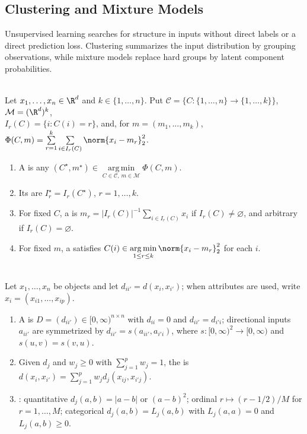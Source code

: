 \subsection{Clustering and Mixture Models}

Unsupervised learning searches for structure in inputs without direct labels or a direct prediction loss.  Clustering summarizes the input distribution by grouping observations, while mixture models replace hard groups by latent component probabilities.

\begin{definition} \label{def:sl-kmeans-objective} \\
Let $x_1,\ldots,x_n\in\R^d$ and $k\in\{1,\ldots,n\}$. Put $\mathcal C=\{C:\{1,\ldots,n\}\to\{1,\ldots,k\}\}$, $\mathcal M=(\R^d)^k$,\\
$I_r(C)=\{i:C(i)=r\}$, and, for $m=(m_1,\ldots,m_k)$, $\Phi(C,m)=\sum\limits_{r=1}^k\sum\limits_{i\in I_r(C)}\norm{x_i-m_r}_2^2$.
\begin{enumerate}[label=(\roman*)]
\setlength{\itemsep}{0pt}
\item A  is any $(C^\star,m^\star)\in\operatorname*{arg\,min}\limits_{C\in\mathcal C,\,m\in\mathcal M}\Phi(C,m)$.
\item Its  are $I_r^\star=I_r(C^\star)$, $r=1,\ldots,k$.
\item For fixed $C$, a  is $m_r=|I_r(C)|^{-1}\sum\limits_{i\in I_r(C)}x_i$ if $I_r(C)\neq\varnothing$, and arbitrary if $I_r(C)=\varnothing$.
\item For fixed $m$, a  satisfies $C(i)\in\operatorname*{arg\,min}\limits_{1\leq r\leq k}\norm{x_i-m_r}_2^2$ for each $i$.
\end{enumerate}
\end{definition}

\begin{definition} \label{def:sl-clustering-dissimilarity} \\
Let $x_1,\ldots,x_n$ be objects and let $d_{ii'}=d(x_i,x_{i'})$; when attributes are used, write $x_i=(x_{i1},\ldots,x_{ip})$.
\begin{enumerate}[label=(\roman*)]
\setlength{\itemsep}{0pt}
\item A  is $D=(d_{ii'})\in[0,\infty)^{n\times n}$ with $d_{ii}=0$ and $d_{ii'}=d_{i'i}$; directional inputs $a_{ii'}$ are symmetrized by $d_{ii'}=s(a_{ii'},a_{i'i})$, where $s:[0,\infty)^2\to[0,\infty)$ and $s(u,v)=s(v,u)$.
\item Given $d_j$ and $w_j\geq0$ with $\sum\limits_{j=1}^p w_j=1$, the  is $d(x_i,x_{i'})=\sum\limits_{j=1}^p w_jd_j(x_{ij},x_{i'j})$.
\item {}: quantitative $d_j(a,b)=|a-b|$ or $(a-b)^2$; ordinal $r\mapsto(r-1/2)/M$ for $r=1,\ldots,M$; categorical $d_j(a,b)=L_j(a,b)$ with $L_j(a,a)=0$ and $L_j(a,b)\geq0$.
\end{enumerate}
\end{definition}

